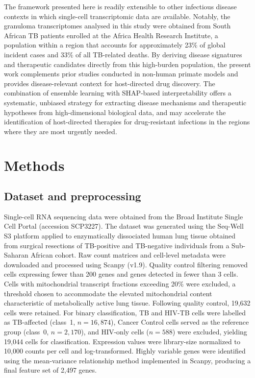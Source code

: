\documentclass[12pt]{article}
\begin{document}
The framework presented here is readily extensible to other infectious disease contexts in which single-cell transcriptomic data are available. Notably, the granuloma transcriptomes analysed in this study were obtained from South African TB patients enrolled at the Africa Health Research Institute\cite{scp3227}, a population within a region that accounts for approximately 23\% of global incident cases and 33\% of all TB-related deaths\cite{who2023}. By deriving disease signatures and therapeutic candidates directly from this high-burden population, the present work complements prior studies conducted in non-human primate models\cite{gideon2022} and provides disease-relevant context for host-directed drug discovery. The combination of ensemble learning with SHAP-based interpretability offers a systematic, unbiased strategy for extracting disease mechanisms and therapeutic hypotheses from high-dimensional biological data, and may accelerate the identification of host-directed therapies for drug-resistant infections in the regions where they are most urgently needed.

\section*{Methods}

\subsection*{Dataset and preprocessing}

Single-cell RNA sequencing data were obtained from the Broad Institute Single Cell Portal (accession SCP3227)\cite{scp3227}. The dataset was generated using the Seq-Well S3 platform applied to enzymatically dissociated human lung tissue obtained from surgical resections of TB-positive and TB-negative individuals from a Sub-Saharan African cohort\cite{shalek2017}. Raw count matrices and cell-level metadata were downloaded and processed using Scanpy (v1.9)\cite{wolf2018}. Quality control filtering removed cells expressing fewer than 200 genes and genes detected in fewer than 3 cells. Cells with mitochondrial transcript fractions exceeding 20\% were excluded, a threshold chosen to accommodate the elevated mitochondrial content characteristic of metabolically active lung tissue\cite{luecken2019}. Following quality control, 19,632 cells were retained. For binary classification, TB and HIV-TB cells were labelled as TB-affected (class~1, $n = 16{,}874$), Cancer Control cells served as the reference group (class~0, $n = 2{,}170$), and HIV-only cells ($n = 588$) were excluded, yielding 19,044 cells for classification. Expression values were library-size normalized to 10,000 counts per cell and log-transformed. Highly variable genes were identified using the mean-variance relationship method implemented in Scanpy, producing a final feature set of 2,497 genes.
\end{document}
